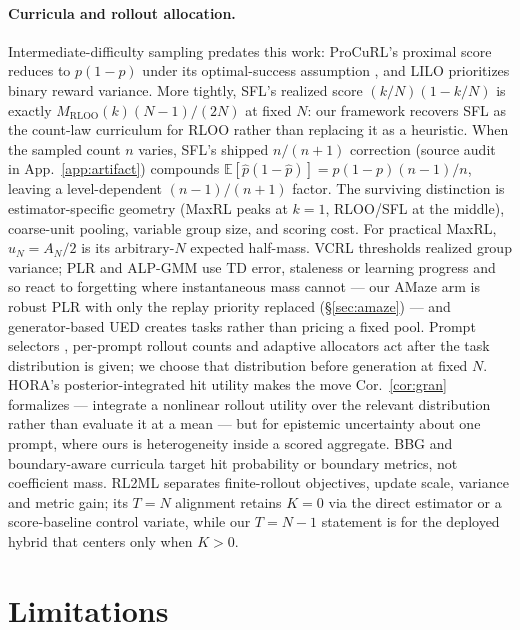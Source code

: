 \paragraph{Curricula and rollout allocation.}
Intermediate-difficulty sampling predates this work: ProCuRL's proximal score
reduces to $p(1-p)$ under its optimal-success assumption \citep{procurl}, and
LILO \citep{lilo} prioritizes binary reward variance. More tightly, SFL's
realized score $(k/N)(1-k/N)$ \citep{sfl} is exactly
$M_{\mathrm{RLOO}}(k)(N-1)/(2N)$ at fixed $N$: our framework recovers SFL as
the count-law curriculum for RLOO rather than replacing it as a heuristic.
When the sampled count $n$ varies, SFL's shipped $n/(n+1)$ correction
(source audit in App.~\ref{app:artifact}) compounds
$\mathbb E[\hat p(1-\hat p)]=p(1-p)(n-1)/n$, leaving a level-dependent
$(n-1)/(n+1)$ factor. The surviving distinction is estimator-specific geometry
(MaxRL peaks at $k=1$, RLOO/SFL at the middle), coarse-unit pooling, variable
group size, and scoring cost. For practical MaxRL, $u_N=A_N/2$ is its
arbitrary-$N$ expected half-mass. VCRL \citep{vcrl} thresholds realized group variance; PLR \citep{plr} and
ALP-GMM \citep{alpgmm} use TD error, staleness or learning progress and so
react to forgetting where instantaneous mass cannot --- our AMaze arm is robust
PLR \citep{minimax} with only the replay priority replaced (\S\ref{sec:amaze})
--- and generator-based UED \citep{paired,accel} creates tasks rather than
pricing a fixed pool. Prompt selectors \citep{greso,dps}, per-prompt rollout
counts \citep{vip} and adaptive allocators \citep{hora,vigor,dars,reinforceada}
act after the task distribution is given; we choose that distribution before
generation at fixed $N$. HORA's posterior-integrated hit utility makes the move
Cor.~\ref{cor:gran} formalizes --- integrate a nonlinear rollout utility over
the relevant distribution rather than evaluate it at a mean --- but for
epistemic uncertainty about one prompt, where ours is heterogeneity inside a
scored aggregate. BBG \citep{yuan} and boundary-aware curricula \citep{cai}
target hit probability or boundary metrics, not coefficient mass. RL2ML
\citep{rl2ml} separates finite-rollout objectives, update scale, variance and
metric gain; its $T=N$ alignment retains $K=0$ via the direct estimator or a
score-baseline control variate, while our $T=N-1$ statement is for the deployed
hybrid that centers only when $K>0$.

\section{Limitations}
\label{sec:limits}

